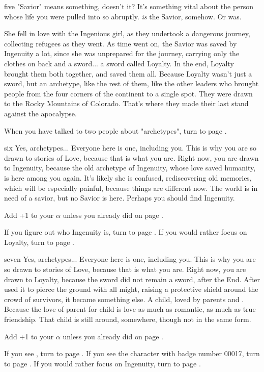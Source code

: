 \documentclass[greennotebook]{Silversiders} %
\begin{document}
\begin{page}{five}
"Savior" means something, doesn't it? It's something vital about the person whose life you were pulled into so abruptly. \cSavior{} \emph{is} the Savior, somehow. Or was.

She fell in love with the Ingenious girl, as they undertook a dangerous journey, collecting refugees as they went. As time went on, the Savior was saved by Ingenuity a lot, since she was unprepared for the journey, carrying only the clothes on \cSavior{\their} back and a sword... a sword called Loyalty. In the end, Loyalty brought them both together, and saved them all. Because Loyalty wasn't just a sword, but an archetype, like the rest of them, like the other leaders who brought people from the four corners of the continent to a single spot. They were drawn to the Rocky Mountains of Colorado. That's where they made their last stand against the apocalypse.

When you have talked to two people about "archetypes", turn to page .
\end{page}

\begin{page}{six}
Yes, archetypes... Everyone here is one, including you. This is why you are so drawn to stories of Love, because that is what you are. Right now, you are drawn to Ingenuity, because the old archetype of Ingenuity, whose love saved humanity, is here among you again. It's likely she is confused, rediscovering old memories, which will be especially painful, because things are different now. The world is in need of a savior, but no Savior is here. Perhaps you should find Ingenuity.

Add +1 to your $\alpha$ unless you already did on page .

If you figure out who Ingenuity is, turn to page .
If you would rather focus on Loyalty, turn to page .
\end{page}

\begin{page}{seven}
Yes, archetypes... Everyone here is one, including you. This is why you are so drawn to stories of Love, because that is what you are. Right now, you are drawn to Loyalty, because the sword did not remain a sword, after the End. After \cSavior{} used it to pierce the ground with all \cSavior{\their} might, raising a protective shield around the crowd of survivors, it became something else. A child, loved by \cLoyalty{\their} parents \cIngenuityOld{} and \cSavior{}. Because the love of parent for child is love as much as romantic, as much as true friendship. That child is still around, somewhere, though not in the same form.

Add +1 to your $\alpha$ unless you already did on page .

If you see \iLoyalty{}, turn to page . If you see the character with badge number 00017, turn to page .
If you would rather focus on Ingenuity, turn to page .
\end{page}
\end{document}
